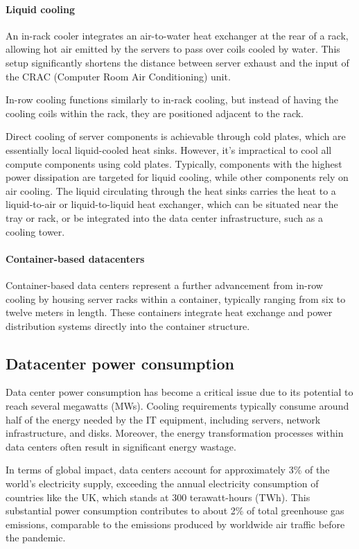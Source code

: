 \paragraph*{Liquid cooling}
An in-rack cooler integrates an air-to-water heat exchanger at the rear of a rack, allowing hot air emitted by the servers to pass over coils cooled by water. 
This setup significantly shortens the distance between server exhaust and the input of the CRAC (Computer Room Air Conditioning) unit.

In-row cooling functions similarly to in-rack cooling, but instead of having the cooling coils within the rack, they are positioned adjacent to the rack.

Direct cooling of server components is achievable through cold plates, which are essentially local liquid-cooled heat sinks. 
However, it's impractical to cool all compute components using cold plates. 
Typically, components with the highest power dissipation are targeted for liquid cooling, while other components rely on air cooling. 
The liquid circulating through the heat sinks carries the heat to a liquid-to-air or liquid-to-liquid heat exchanger, which can be situated near the tray or rack, or be integrated into the data center infrastructure, such as a cooling tower.

\paragraph*{Container-based datacenters}
Container-based data centers represent a further advancement from in-row cooling by housing server racks within a container, typically ranging from six to twelve meters in length. 
These containers integrate heat exchange and power distribution systems directly into the container structure.

\subsection{Datacenter power consumption}
Data center power consumption has become a critical issue due to its potential to reach several megawatts (MWs). 
Cooling requirements typically consume around half of the energy needed by the IT equipment, including servers, network infrastructure, and disks.
Moreover, the energy transformation processes within data centers often result in significant energy wastage.

In terms of global impact, data centers account for approximately 3\% of the world's electricity supply, exceeding the annual electricity consumption of countries like the UK, which stands at 300 terawatt-hours (TWh). 
This substantial power consumption contributes to about 2\% of total greenhouse gas emissions, comparable to the emissions produced by worldwide air traffic before the pandemic.

